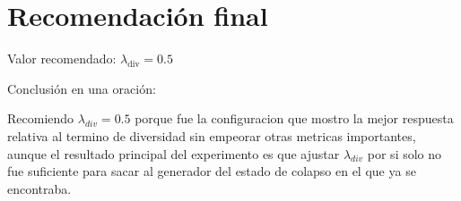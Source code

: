 \documentclass[11pt,letterpaper]{article}
\newenvironment{responsebox}{\begin{tcolorbox}[colframe=black!50]}{\end{tcolorbox}}
\begin{document}
\section*{Recomendación final}

Valor recomendado: $\lambda_{\mathrm{div}}=0.5$

Conclusión en una oración:
\begin{responsebox}
Recomiendo $\lambda_{div}=0.5$ porque fue la configuracion que mostro la mejor respuesta relativa al termino de diversidad sin empeorar otras metricas importantes, aunque el resultado principal del experimento es que ajustar $\lambda_{div}$ por si solo no fue suficiente para sacar al generador del estado de colapso en el que ya se encontraba.
\end{responsebox}
\end{document}
